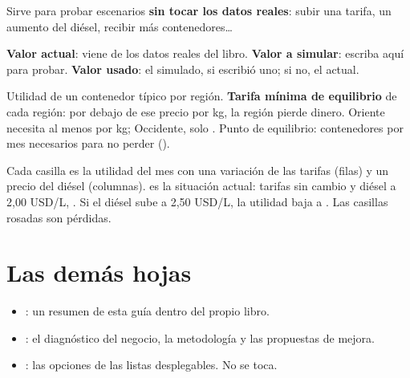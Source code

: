 Sirve para probar escenarios \textbf{sin tocar los datos reales}: subir una tarifa, un aumento del diésel, recibir más contenedores\dots

 \textbf{Valor actual}: viene de los datos reales del libro.  \textbf{Valor a simular}: escriba aquí para probar.
 \textbf{Valor usado}: el simulado, si escribió uno; si no, el actual.

 Utilidad de un contenedor típico por región.  \textbf{Tarifa mínima de equilibrio} de cada región: por debajo de ese
precio por kg, la región pierde dinero. Oriente necesita al menos \vSimTminOri{} por kg; Occidente, solo \vSimTminOcc.
 Punto de equilibrio: contenedores por mes necesarios para no perder (\vSimPE).

Cada casilla es la utilidad del mes con una variación de las tarifas (filas) y un precio del diésel (columnas).  es la situación
actual: tarifas sin cambio y diésel a 2,00 USD/L, \vSimGrid. Si el diésel sube a 2,50 USD/L, la utilidad baja a \vSimGridMas. Las casillas
rosadas son pérdidas.


\section{Las demás hojas}
\begin{itemize}
  \item {}: un resumen de esta guía dentro del propio libro.
  \item {}: el diagnóstico del negocio, la metodología y las propuestas de mejora.
  \item {}: las opciones de las listas desplegables. No se toca.
\end{itemize}
